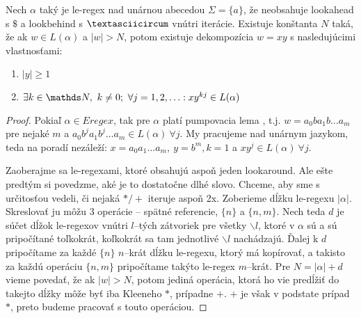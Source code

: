 \begin{veta}
Nech $\alpha$ taký je le-regex nad unárnou abecedou $\Sigma = \lbrace a \rbrace$, že neobsahuje lookahead s $\mathdollar$ a lookbehind s $\textasciicircum$ vnútri iterácie.  Existuje konštanta $N$ taká, že ak $w \in L(\alpha)$ a $\vert w \vert > N$, potom existuje dekompozícia $w=xy$ s nasledujúcimi vlastnosťami:
\begin{enumerate}
\item $\vert y \vert \geq 1$
\item $\exists k \in \N,~k\neq 0;~\forall j = 1,2,\ldots: xy^{kj} \in L(\alpha)$
\end{enumerate}
\end{veta}
\begin{proof}
Pokiaľ $\alpha \in Eregex$, tak pre $\alpha$ platí pumpovacia lema \cite[Lemma 1]{ExtendedRegexPower}, t.j. $w = a_0ba_1b\dots a_m$ pre nejaké $m$ a $a_0b^ja_1b^j\dots a_m \in L(\alpha)~\forall j$. My pracujeme nad unárnym jazykom, teda na poradí nezáleží: $x=a_0a_1\dots a_m,~y=b^m, k=1$ a $xy^j \in L(\alpha)~\forall j$.

Zaoberajme sa le-regexami, ktoré obsahujú aspoň jeden lookaround. Ale ešte predtým si povedzme, aké je to dostatočne dlhé slovo. Chceme, aby sme s určitosťou vedeli, či nejaká $*/+$ iteruje aspoň 2x. Zoberieme dĺžku le-regexu $\vert \alpha \vert$. Skreslovať ju môžu 3 ope\-rá\-cie -- spätné referencie, $\lbrace n \rbrace$ a $\lbrace n,m \rbrace$. Nech teda $d$ je súčet dĺžok le-regexov vnútri $l$--tých zátvoriek pre všetky $\backslash l$, ktoré v $\alpha$ sú a sú pripočítané toľkokrát, koľkokrát sa tam jednotlivé $\backslash l$ nachádzajú. Ďalej k $d$ pripočítame za každé $\lbrace n \rbrace$ $n$--krát dĺžku le-regexu, ktorý má kopírovať, a takisto za každú operáciu $\lbrace n,m \rbrace$ pripočítame takýto le-regex $m$--krát. Pre $N = \vert \alpha \vert + d$ vieme povedať, že ak $\vert w \vert > N$, potom jediná operácia, ktorá ho vie predĺžiť do takejto dĺžky môže byť iba Kleeneho $*$, prípadne $+$. $+$ je však v podstate prípad $*$, preto budeme pracovať s touto operáciou.


\end{proof}
